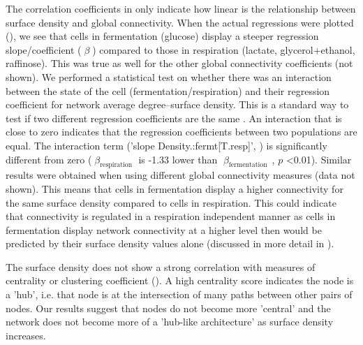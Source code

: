 The correlation coefficients in  only indicate how linear is the relationship between surface density and global connectivity. When the actual regressions were plotted (), we see that cells in fermentation (glucose) display a steeper regression slope/coefficient ($\mitbeta$) compared to those in respiration (lactate, glycerol+ethanol, raffinose). This was true as well for the other global connectivity coefficients (not shown). We performed a statistical test on whether there was an interaction between the state of the cell (fermentation/respiration) and their regression coefficient for network average degree--surface density. This is a standard way to test if two different regression coefficients are the same \cite{jacoby_regression}. An interaction that is close to zero indicates that the regression coefficients between two populations are equal. The interaction term ('slope Density.:fermt[T.resp]', ) is significantly different from zero ($\mitbeta_{\mathrm{respiration}}$ is -1.33 lower than $\mitbeta_{\mathrm{fermentation}}\,$, $p$ <0.01). Similar results were obtained when using different global connectivity measures (data not shown). This means that cells in fermentation display a higher connectivity for the same surface density compared to cells in respiration. This could indicate that connectivity is regulated in a respiration independent manner as cells in fermentation display network connectivity at a higher level then would be predicted by their surface density values alone (discussed in more detail in ).

The surface density does not show a strong correlation with measures of centrality or clustering coefficient (). A high centrality score indicates the node is a 'hub', i.e. that node is at the intersection of many paths between other pairs of nodes. Our results suggest that nodes do not become more 'central' and the network does not become more of a 'hub-like architecture' as surface density increases.
